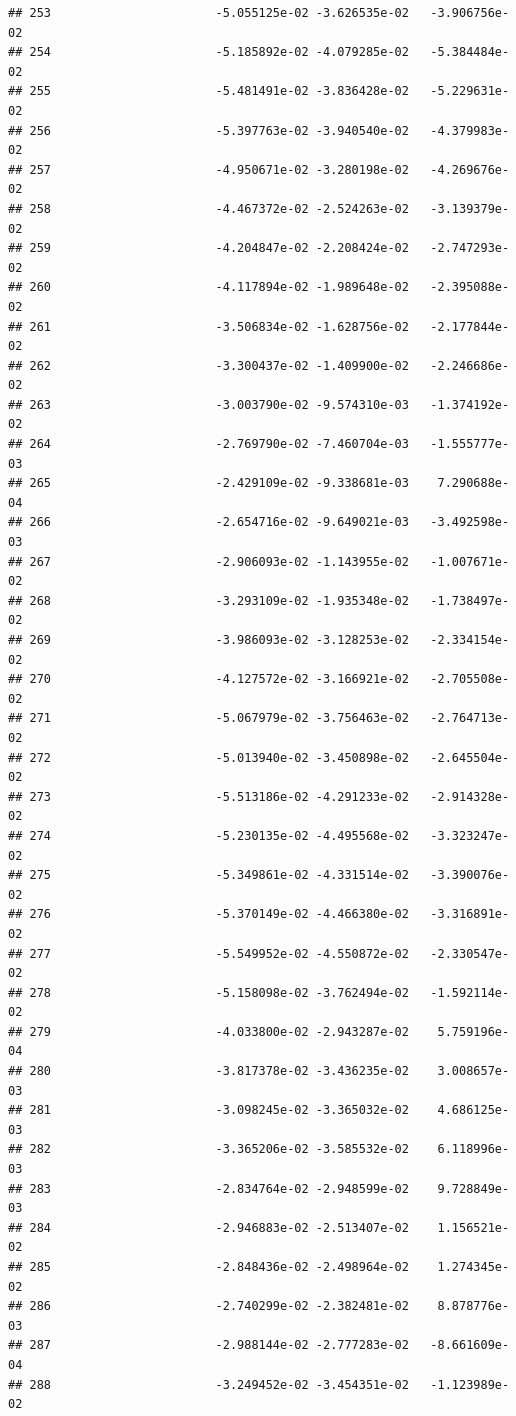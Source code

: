 \documentclass[
]{article}
\begin{document}
\begin{verbatim}
## 253                       -5.055125e-02 -3.626535e-02   -3.906756e-02
## 254                       -5.185892e-02 -4.079285e-02   -5.384484e-02
## 255                       -5.481491e-02 -3.836428e-02   -5.229631e-02
## 256                       -5.397763e-02 -3.940540e-02   -4.379983e-02
## 257                       -4.950671e-02 -3.280198e-02   -4.269676e-02
## 258                       -4.467372e-02 -2.524263e-02   -3.139379e-02
## 259                       -4.204847e-02 -2.208424e-02   -2.747293e-02
## 260                       -4.117894e-02 -1.989648e-02   -2.395088e-02
## 261                       -3.506834e-02 -1.628756e-02   -2.177844e-02
## 262                       -3.300437e-02 -1.409900e-02   -2.246686e-02
## 263                       -3.003790e-02 -9.574310e-03   -1.374192e-02
## 264                       -2.769790e-02 -7.460704e-03   -1.555777e-03
## 265                       -2.429109e-02 -9.338681e-03    7.290688e-04
## 266                       -2.654716e-02 -9.649021e-03   -3.492598e-03
## 267                       -2.906093e-02 -1.143955e-02   -1.007671e-02
## 268                       -3.293109e-02 -1.935348e-02   -1.738497e-02
## 269                       -3.986093e-02 -3.128253e-02   -2.334154e-02
## 270                       -4.127572e-02 -3.166921e-02   -2.705508e-02
## 271                       -5.067979e-02 -3.756463e-02   -2.764713e-02
## 272                       -5.013940e-02 -3.450898e-02   -2.645504e-02
## 273                       -5.513186e-02 -4.291233e-02   -2.914328e-02
## 274                       -5.230135e-02 -4.495568e-02   -3.323247e-02
## 275                       -5.349861e-02 -4.331514e-02   -3.390076e-02
## 276                       -5.370149e-02 -4.466380e-02   -3.316891e-02
## 277                       -5.549952e-02 -4.550872e-02   -2.330547e-02
## 278                       -5.158098e-02 -3.762494e-02   -1.592114e-02
## 279                       -4.033800e-02 -2.943287e-02    5.759196e-04
## 280                       -3.817378e-02 -3.436235e-02    3.008657e-03
## 281                       -3.098245e-02 -3.365032e-02    4.686125e-03
## 282                       -3.365206e-02 -3.585532e-02    6.118996e-03
## 283                       -2.834764e-02 -2.948599e-02    9.728849e-03
## 284                       -2.946883e-02 -2.513407e-02    1.156521e-02
## 285                       -2.848436e-02 -2.498964e-02    1.274345e-02
## 286                       -2.740299e-02 -2.382481e-02    8.878776e-03
## 287                       -2.988144e-02 -2.777283e-02   -8.661609e-04
## 288                       -3.249452e-02 -3.454351e-02   -1.123989e-02

\end{verbatim}
\end{document}
